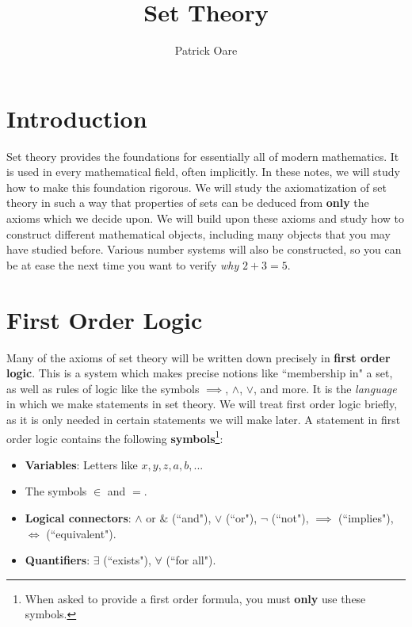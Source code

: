 \documentclass[11pt, oneside]{article}   	%
\title{Set Theory}
\author{Patrick Oare}
\date{}							%
\theoremstyle{definition}
\begin{document}
\maketitle
\section{Introduction}

Set theory provides the foundations for essentially all of modern mathematics. It is used in every mathematical field, often 
implicitly. In these notes, we will study how to make this foundation rigorous. We will study the axiomatization of set theory 
in such a way that properties of sets can be deduced from \textbf{only} the axioms which we decide upon. We will build 
upon these axioms and study how to construct different mathematical objects, including many objects that you may have 
studied before. Various number systems will also be constructed, so you can be at ease the next time you want to verify 
\textit{why} $2 + 3 = 5$.

\section{First Order Logic}

Many of the axioms of set theory will be written down precisely in \textbf{first order logic}. This is a system which makes precise 
notions like ``membership in" a set, as well as rules of logic like the symbols $\implies$, $\wedge$, $\vee$, and more. It is 
the \textit{language} in which we make statements in set theory. We will treat first order logic briefly, as it is only needed in certain 
statements we will make later. A statement in first order logic contains the following \textbf{symbols}\footnote{When asked to 
provide a first order formula, you must \textbf{only} use these symbols.}:

\begin{itemize}
	\item \textbf{Variables}: Letters like $x, y, z, a, b, ...$
	\item The symbols $\in$ and $=$. 
	\item \textbf{Logical connectors}: $\wedge$ or $\&$ (``and"), $\vee$ (``or"), $\neg$ (``not"), $\implies$ (``implies"), $\iff$ 
	(``equivalent").
	\item \textbf{Quantifiers}: $\exists$ (``exists"), $\forall$ (``for all").
\end{itemize}
\end{document}
